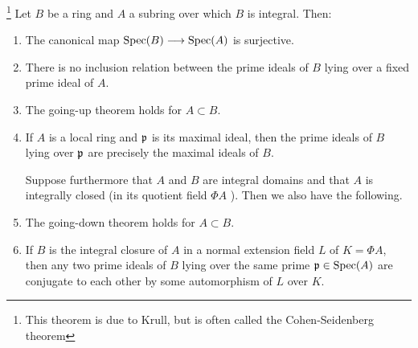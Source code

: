 \documentclass[../main]{subfiles}
\begin{document}
\begin{partheorem}\label{thm:005} \footnote{This theorem is due to Krull, but is often called the Cohen-Seidenberg theorem} Let $B$ be a ring and $A$ a subring over which $B$ is integral. Then:

\begin{enumerate}[label = \roman*)]
  \item\label{th:02.05.Ei} The canonical map $\operatorname{Spec}(B) \longrightarrow \operatorname{Spec}(A)$ is surjective.

  \item\label{th:02.05.Eii} There is no inclusion relation between the prime ideals of $B$ lying over a fixed prime ideal of $A$.

  \item\label{th:02.05.Eiii} The going-up theorem holds for $A \subset B$.

  \item\label{th:02.05.Eiv} If $A$ is a local ring and $\mathfrak{p}$ is its maximal ideal, then the prime ideals of $B$ lying over $\mathfrak{p}$ are precisely the maximal ideals of $B$.

Suppose furthermore that $A$ and $B$ are integral domains and that $A$ is integrally closed (in its quotient field $\Phi A$ ). Then we also have the following.

  \item\label{th:02.05.Ev} The going-down theorem holds for $A \subset B$.

  \item\label{th:02.05.Evi} If $B$ is the integral closure of $A$ in a normal extension field $L$ of $K = \Phi A$, then any two prime ideals of $B$ lying over the same prime $\mathfrak{p} \in \operatorname{Spec}(A)$ are conjugate to each other by some automorphism of $L$ over $K$.

\end{enumerate}
\end{partheorem}
\end{document}
